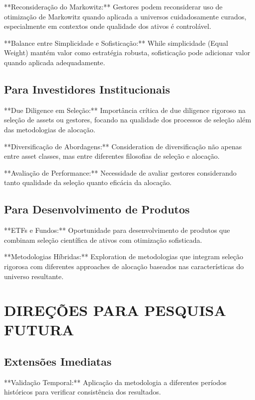 **Reconsideração do Markowitz:** Gestores podem reconsiderar uso de otimização de Markowitz quando aplicada a universos cuidadosamente curados, especialmente em contextos onde qualidade dos ativos é controlável.

**Balance entre Simplicidade e Sofisticação:** While simplicidade (Equal Weight) mantém valor como estratégia robusta, sofisticação pode adicionar valor quando aplicada adequadamente.

\subsection{Para Investidores Institucionais}

**Due Diligence em Seleção:** Importância crítica de due diligence rigoroso na seleção de assets ou gestores, focando na qualidade dos processos de seleção além das metodologias de alocação.

**Diversificação de Abordagens:** Consideration de diversificação não apenas entre asset classes, mas entre diferentes filosofias de seleção e alocação.

**Avaliação de Performance:** Necessidade de avaliar gestores considerando tanto qualidade da seleção quanto eficácia da alocação.

\subsection{Para Desenvolvimento de Produtos}

**ETFs e Fundos:** Oportunidade para desenvolvimento de produtos que combinam seleção científica de ativos com otimização sofisticada.

**Metodologias Híbridas:** Exploration de metodologias que integram seleção rigorosa com diferentes approaches de alocação baseados nas características do universo resultante.

\section{DIREÇÕES PARA PESQUISA FUTURA}

\subsection{Extensões Imediatas}

**Validação Temporal:** Aplicação da metodologia a diferentes períodos históricos para verificar consistência dos resultados.

